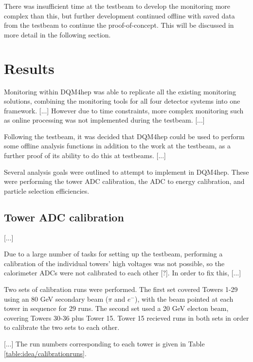There was insufficient time at the testbeam to develop the monitoring more complex than this, but further development continued offline with saved data from the testbeam to continue the proof-of-concept. This will be discussed in more detail in the following section.

\section{Results}
Monitoring within \acrshort{DQM4hep} was able to replicate all the existing monitoring solutions, combining the monitoring tools for all four detector systems into one framework. [...] However due to time constraints, more complex monitoring such as online processing was not implemented during the testbeam. [...] 

Following the testbeam, it was decided that \acrshort{DQM4hep} could be used to perform some offline analysis functions in addition to the work at the testbeam, as a further proof of its ability to do this at testbeams. [...]

Several analysis goals were outlined to attempt to implement in \acrshort{DQM4hep}. These were performing the tower \acrshort{ADC} calibration, the \acrshort{ADC} to energy calibration, and particle selection efficiencies. 

\subsection{Tower ADC calibration}
[...]

Due to a large number of tasks for setting up the testbeam, performing a calibration of the individual towers' high voltages was not possible, so the calorimeter \acrshort{ADC}s were not calibrated to each other [?]. In order to fix this, [...]

Two sets of calibration runs were performed. The first set covered Towers 1-29 using an 80 GeV secondary beam ($\pi$ and $e^{-}$), with the beam pointed at each tower in sequence for 29 runs. The second set used a 20 GeV electon beam, covering Towers 30-36 plus Tower 15. Tower 15 recieved runs in both sets in order to calibrate the two sets to each other. 

[...] The run numbers corresponding to each tower is given in Table \ref{table:idea/calibrationruns}.

